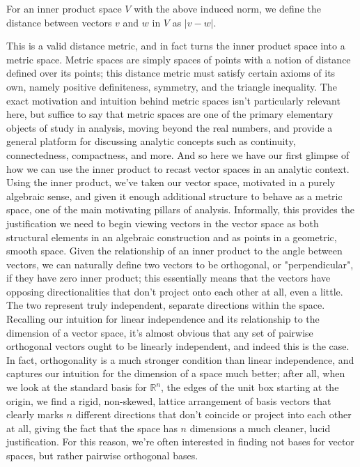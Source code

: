 \documentclass{article}
\newcommand{\n}{\leavevmode \newline}
\newcommand{\nn}{\leavevmode \newline \newline}
\newcommand{\R}{\mathbb{R}}
\begin{document}
\n
\begin{adjustwidth}{1cm}{1cm}

    For an inner product space $ V $ with the above induced norm, we define the distance between vectors $ v $ and $ w $ in $ V $ as $ | v - w | $.

\end{adjustwidth}
\n
This is a valid distance metric, and in fact turns the inner product space into a metric space. Metric spaces are simply spaces of points with a notion of distance defined over its points; this distance metric must satisfy certain axioms of its own, namely positive definiteness, symmetry, and the triangle inequality. The exact motivation and intuition behind metric spaces isn't particularly relevant here, but suffice to say that metric spaces are one of the primary elementary objects of study in analysis, moving beyond the real numbers, and provide a general platform for discussing analytic concepts such as continuity, connectedness, compactness, and more. And so here we have our first glimpse of how we can use the inner product to recast vector spaces in an analytic context. Using the inner product, we've taken our vector space, motivated in a purely algebraic sense, and given it enough additional structure to behave as a metric space, one of the main motivating pillars of analysis. Informally, this provides the justification we need to begin viewing vectors in the vector space as both structural elements in an algebraic construction and as points in a geometric, smooth space.
\nn
Given the relationship of an inner product to the angle between vectors, we can naturally define two vectors to be orthogonal, or "perpendicular", if they have zero inner product; this essentially means that the vectors have opposing directionalities that don't project onto each other at all, even a little. The two represent truly independent, separate directions within the space. Recalling our intuition for linear independence and its relationship to the dimension of a vector space, it's almost obvious that any set of pairwise orthogonal vectors ought to be linearly independent, and indeed this is the case. In fact, orthogonality is a much stronger condition than linear independence, and captures our intuition for the dimension of a space much better; after all, when we look at the standard basis for $ \R^n $, the edges of the unit box starting at the origin, we find a rigid, non-skewed, lattice arrangement of basis vectors that clearly marks $ n $ different directions that don't coincide or project into each other at all, giving the fact that the space has $ n $ dimensions a much cleaner, lucid justification. For this reason, we're often interested in finding not bases for vector spaces, but rather pairwise orthogonal bases.
\end{document}
